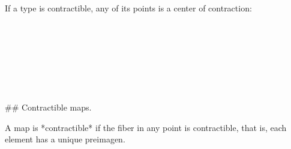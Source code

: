 If a type is contractible, any of its points is a center of contraction:

\begin{code}%
\>[0][@{}l@{\AgdaIndent{1}}]%
\>[2]\AgdaComment{}\<%
\\
%
\>[2]\<%
\\
\>[2][@{}l@{\AgdaIndent{0}}]%
\>[4]\AgdaSymbol{:}\AgdaSpace{}%
\AgdaSpace{}%
\AgdaSymbol{\{}\AgdaSymbol{\}}\AgdaSpace{}%
\AgdaSymbol{\{}\AgdaSpace{}%
\AgdaSymbol{:}\AgdaSpace{}%
\AgdaSpace{}%
\AgdaSymbol{\}}\<%
\\
%
\>[4]\AgdaSpace{}%
\AgdaSymbol{(}\AgdaSpace{}%
\AgdaSymbol{:}\AgdaSpace{}%
\AgdaSymbol{)}\AgdaSpace{}%
\AgdaSpace{}%
\AgdaSymbol{(}\AgdaSpace{}%
\AgdaSymbol{:}\AgdaSpace{}%
\AgdaSymbol{(}\AgdaSpace{}%
\AgdaSymbol{:}\AgdaSpace{}%
\AgdaSymbol{)}\AgdaSpace{}%
\AgdaSpace{}%
\AgdaSpace{}%
\AgdaOperator{\AgdaDatatype{==}}\AgdaSpace{}%
\AgdaSymbol{)}\<%
\\
%
\>[4]\AgdaSpace{}%
\AgdaSpace{}%
\AgdaSymbol{(}\AgdaSpace{}%
\AgdaSymbol{:}\AgdaSpace{}%
\AgdaSymbol{)}\AgdaSpace{}%
\AgdaSpace{}%
\AgdaSpace{}%
\AgdaSymbol{(}\AgdaSpace{}%
\AgdaSymbol{:}\AgdaSpace{}%
\AgdaSymbol{)}\AgdaSpace{}%
\AgdaSpace{}%
\AgdaSpace{}%
\AgdaOperator{\AgdaDatatype{==}}\AgdaSpace{}%
\AgdaSymbol{))}\<%
\\
%
\>[2]\AgdaSpace{}%
\AgdaSpace{}%
\AgdaSpace{}%
\AgdaSpace{}%
\AgdaSpace{}%
\AgdaSymbol{=}\AgdaSpace{}%
\AgdaOperator{\AgdaFunction{!}}\AgdaSpace{}%
\AgdaSymbol{(}\AgdaSpace{}%
\AgdaSymbol{)}\AgdaSpace{}%
\AgdaSpace{}%
\AgdaSymbol{(}\AgdaSpace{}%
\AgdaSymbol{)}\<%
\\
\>[0]\<%
\end{code}

## Contractible maps.

A map is *contractible* if the fiber in any point is contractible, that is, each
element has a unique preimagen.

